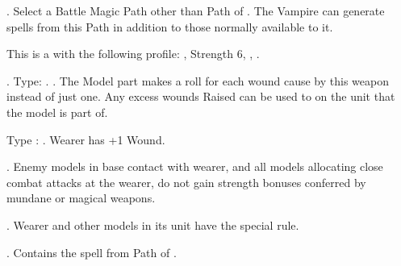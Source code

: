  \textbf{\bloodlinepower}. Select a Battle Magic Path other than Path of \nature{}. The Vampire can generate spells from this Path in addition to those normally available to it.

\endpricelist


\closearmynewsection

\startarmymagicitems

\armymagicweapons

\startpricelist

 This is a \boltthrower{} \artilleryweapon{} with the following profile: , Strength 6, , .

 . Type: \hw{}. . The Model part makes a \vampiric{} roll for each  wound cause by this weapon instead of just one. Any excess wounds Raised can be used to \raisewounds{} on the unit that the model is part of.

\endpricelist

\armymagicarmor

\startpricelist

 Type : \platearmour . Wearer has +1 Wound.

\endpricelist

\armytalismans

\startpricelist

 . Enemy models in base contact with wearer, and all models allocating close combat attacks at the wearer, do not gain strength bonuses  conferred by mundane or magical weapons.

\endpricelist

\armyenchanteditems

\startpricelist

 . Wearer and other \rnf{} models in its unit have the \distracting{} special rule.

\endpricelist

\armyarcaneitems

\startpricelist

 . Contains the spell \necromancyspelltwo{} from Path of \necromancy .

